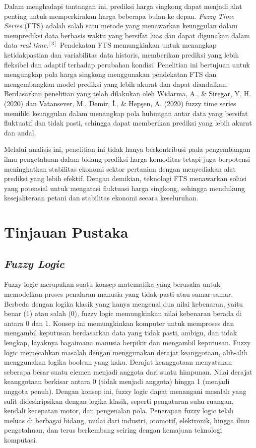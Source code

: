 \documentclass[conference]{IEEEtran}
\begin{document}
Dalam menghadapi tantangan ini, prediksi harga singkong dapat menjadi alat penting untuk memperkirakan harga beberapa bulan ke depan. \textit{Fuzzy Time Series} (FTS) adalah salah satu metode yang menawarkan keunggulan dalam memprediksi data berbasis waktu yang bersifat luas dan dapat digunakan dalam data \textit{real time}.$^{[3]}$ Pendekatan FTS memungkinkan untuk menangkap ketidakpastian dan variabilitas data historis, memberikan prediksi yang lebih fleksibel dan adaptif terhadap perubahan kondisi. Penelitian ini bertujuan untuk mengungkap pola harga singkong menggunakan pendekatan FTS dan mengembangkan model prediksi yang lebih akurat dan dapat diandalkan. Berdasarkan penelitian yang telah dilakukan oleh Widarma, A., \& Siregar, Y. H. (2020) dan Vatansever, M., Demir, İ., \& Hepşen, A. (2020) fuzzy time series memiliki keunggulan dalam menangkap pola hubungan antar data yang bersifat fluktuatif dan tidak pasti, sehingga dapat memberikan prediksi yang lebih akurat dan andal.

Melalui analisis ini, penelitian ini tidak hanya berkontribusi pada pengembangan ilmu pengetahuan dalam bidang prediksi harga komoditas tetapi juga berpotensi meningkatkan stabilitas ekonomi sektor pertanian dengan menyediakan alat prediksi yang lebih efektif. Dengan demikian, teknologi FTS menawarkan solusi yang potensial untuk mengatasi fluktuasi harga singkong, sehingga mendukung kesejahteraan petani dan stabilitas ekonomi secara keseluruhan.


\section{Tinjauan Pustaka}
\subsection{\textit{Fuzzy Logic}}
Fuzzy logic merupakan suatu konsep matematika yang berusaha untuk memodelkan proses penalaran manusia yang tidak pasti atau samar-samar. Berbeda dengan logika klasik yang hanya mengenal dua nilai kebenaran, yaitu benar (1) atau salah (0), fuzzy logic memungkinkan nilai kebenaran berada di antara 0 dan 1. Konsep ini memungkinkan komputer untuk memproses dan mengambil keputusan berdasarkan data yang tidak pasti, ambigu, dan tidak lengkap, layaknya bagaimana manusia berpikir dan mengambil keputusan. Fuzzy logic memecahkan masalah dengan menggunakan derajat keanggotaan, alih-alih menggunakan logika boolean yang kaku. Derajat keanggotaan menyatakan seberapa besar suatu elemen menjadi anggota dari suatu himpunan. Nilai derajat keanggotaan berkisar antara 0 (tidak menjadi anggota) hingga 1 (menjadi anggota penuh). Dengan konsep ini, fuzzy logic dapat menangani masalah yang sulit dideskripsikan dengan logika klasik, seperti pengaturan suhu ruangan, kendali kecepatan motor, dan pengenalan pola. Penerapan fuzzy logic telah meluas di berbagai bidang, mulai dari industri, otomotif, elektronik, hingga ilmu pengetahuan, dan terus berkembang seiring dengan kemajuan teknologi komputasi.
\end{document}
